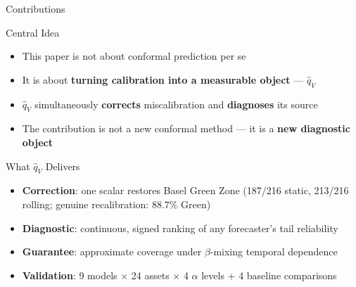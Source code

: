 \documentclass[9pt, aspectratio=169, t]{beamer}
\newcommand{\qV}{\hat{q}_V}
\begin{document}
\begin{frame}{Contributions}
	\vspace{-0.2cm}
	{\small
	\begin{block}{Central Idea}
		\begin{itemize}\setlength{\itemsep}{2pt}
			\item This paper is not about conformal prediction per se
			\item It is about \textbf{turning calibration into a measurable object} --- $\qV$
			\item $\qV$ simultaneously \textbf{corrects} miscalibration and \textbf{diagnoses} its source
			\item The contribution is not a new conformal method --- it is a \textbf{new diagnostic object}
		\end{itemize}
	\end{block}
	\vspace{1mm}
	\begin{exampleblock}{What $\qV$ Delivers}
		\begin{itemize}\setlength{\itemsep}{2pt}
			\item \textbf{Correction}: one scalar restores Basel Green Zone (187/216 static, 213/216 rolling; genuine recalibration: 88.7\% Green)
			\item \textbf{Diagnostic}: continuous, signed ranking of any forecaster's tail reliability
			\item \textbf{Guarantee}: approximate coverage under $\beta$-mixing temporal dependence
			\item \textbf{Validation}: 9 models $\times$ 24 assets $\times$ 4 $\alpha$ levels + 4 baseline comparisons
		\end{itemize}
	\end{exampleblock}
	}
\end{frame}
\end{document}
